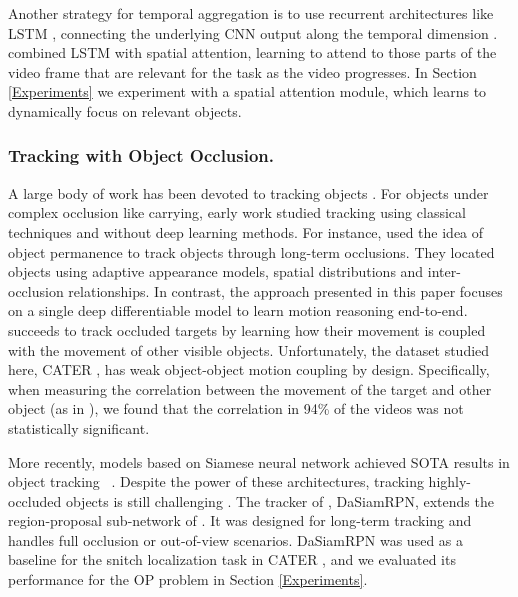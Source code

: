 \documentclass[]{llncs}
\newcommand{\secref}[1]{Section \ref{#1}}
\begin{document}
Another strategy for temporal aggregation is to use recurrent architectures like LSTM \cite{hochreiter1997long}, connecting the underlying CNN output along the temporal dimension \cite{yue2015beyond}. \cite{gao2017video,song2017end,sharma2015action} combined LSTM with spatial attention, learning to attend to those parts of the video frame that are relevant for the task as the video progresses. In \secref{Experiments} we experiment with a spatial attention module, which learns to dynamically focus on relevant objects.


\subsubsection{Tracking with Object Occlusion.} A large body of work has been devoted to tracking objects \cite{mojtaba2019deep}. For objects under complex occlusion like carrying, early work studied tracking using classical techniques and without deep learning methods.
For instance,  \cite{huang2005tracking,papadourakis2010multiple} used the idea of object permanence to track objects through long-term occlusions. They located objects using adaptive appearance models, spatial distributions
and inter-occlusion relationships. 
In contrast, the approach presented in this paper focuses on a single deep differentiable model to learn motion reasoning end-to-end.
\cite{grabner2010tracking} succeeds to track occluded targets by learning how their movement is coupled with the movement of other visible objects. 
Unfortunately, the dataset studied here, CATER \cite{girdhar2019cater}, has weak object-object motion coupling by design. Specifically, when measuring the
correlation between the movement of the target and other object (as in \cite{grabner2010tracking}), we found that the correlation in 94\% of the videos was not statistically significant.

More recently, models based on Siamese neural network achieved SOTA results in object tracking~ \cite{Fan_2019,Li2018HighPV,Zhu_2018_ECCV}. Despite the power of these architectures, tracking highly-occluded objects is still challenging \cite{mojtaba2019deep}.
The tracker of \cite{Zhu_2018_ECCV}, DaSiamRPN, extends the region-proposal sub-network of \cite{Li2018HighPV}. It was designed for long-term tracking and handles full occlusion or out-of-view scenarios. DaSiamRPN was used as a baseline for the snitch localization task in CATER \cite{girdhar2019cater}, and we evaluated its performance for the OP problem in \secref{Experiments}.
\end{document}
